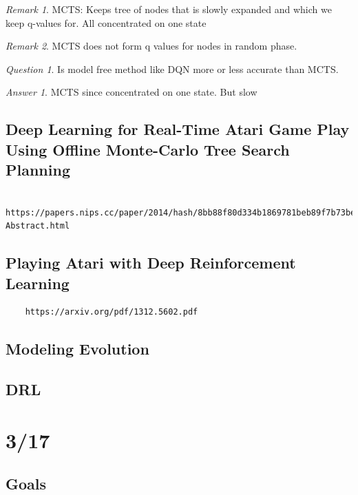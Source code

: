 \documentclass[11pt]{article}
\theoremstyle{remark}
\newtheorem{remark}{Remark}
\newtheorem{quest}{Question}
\newtheorem{ans}{Answer}
\begin{document}
\begin{remark}
	MCTS: Keeps tree of nodes that is slowly expanded and which we keep q-values for. All concentrated on one state
\end{remark}

\begin{remark}
	MCTS does not form q values for nodes in random phase.
\end{remark}

\begin{quest}
	Is model free method like DQN more or less accurate than MCTS.
\end{quest}

\begin{ans}
	MCTS since concentrated on one state. But slow
\end{ans}

\subsection{Deep Learning for Real-Time Atari Game Play Using Offline Monte-Carlo Tree Search Planning}

\begin{verbatim}
	https://papers.nips.cc/paper/2014/hash/8bb88f80d334b1869781beb89f7b73be-Abstract.html
\end{verbatim}

\subsection{Playing Atari with Deep Reinforcement Learning}

\begin{verbatim}
	https://arxiv.org/pdf/1312.5602.pdf
\end{verbatim}

\subsection{Modeling Evolution}

\subsection{DRL}

\section{3/17}

\subsection{Goals}
\end{document}
